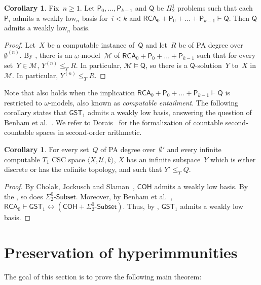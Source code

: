 \documentclass{article}
\def\U{\mathcal{U}}
\def\M{\mathcal{M}}
\def\Psf{\mathsf{P}}
\def\Qsf{\mathsf{Q}}
\newcommand{\Sub}[1]{{#1}\mbox{-}\mathsf{Subset}}
\newcommand{\RCA}{\mathsf{RCA}}
\newcommand{\COH}{\mathsf{COH}}
\newcommand{\GST}{\mathsf{GST}_1}
\numberwithin{theorem}{section}
\theoremstyle{definition}
\newtheorem{corollary}[theorem]{Corollary}
\begin{document}
\begin{corollary}\label{cor:weakly-low-provability}
Fix~$n \geq 1$. Let $\Psf_0, \dots, \Psf_{k-1}$ and $\Qsf$ be $\Pi^1_2$ problems such that
each $\Psf_i$ admits a weakly low${}_n$ basis for~$i < k$ and $\RCA_0 + \Psf_0 + \dots + \Psf_{k-1} \vdash \Qsf$.
Then $\Qsf$ admits a weakly low${}_n$ basis.
\end{corollary}
\begin{proof}
Let~$X$ be a computable instance of~$\Qsf$ and let~$R$ be of PA degree over~$\emptyset^{(n)}$.
By , there is an $\omega$-model~$\M$ of $\RCA_0 + \Psf_0 + \dots + \Psf_{k-1}$
such that for every set~$Y \in \M$, $Y^{(n)} \leq_T R$. In particular, $\M \models \Qsf$, so there is a $\Qsf$-solution~$Y$ to~$X$ in~$\M$. In particular, $Y^{(n)} \leq_T R$.
\end{proof}

Note that  also holds when the implication $\RCA_0 + \Psf_0 + \dots + \Psf_{k-1} \vdash \Qsf$ is restricted to $\omega$-models, also known as \emph{computable entailment}.
The following corollary states that $\GST$ admits a weakly low basis, answering the question of Benham et al.~\cite{benham2024ginsburg}. We refer to Dorais~\cite{dorais2011reverse} for the formalization of countable second-countable spaces in second-order arithmetic.

\begin{corollary}
For every set~$Q$ of PA degree over~$\emptyset'$ and every infinite computable $T_1$ CSC space $\langle X, \U, k\rangle$, $X$ has an infinite subspace~$Y$ which is either discrete or has the cofinite topology, and such that $Y' \leq_T Q$.
\end{corollary}
\begin{proof}
By Cholak, Jockusch and Slaman~\cite{cholak2001strength}, $\COH$ admits a weakly low basis.
By the , so does $\Sub{\Sigma^0_2}$. Moreover, by Benham et al.~\cite{benham2024ginsburg}, 
$\RCA_0 \vdash \GST \leftrightarrow (\COH + \Sub{\Sigma^0_2})$. Thus, by , $\GST$ admits a weakly low basis.
\end{proof}


\section{Preservation of hyperimmunities}\label{sect:preservation-hyps}

The goal of this section is to prove the following main theorem:
\end{document}
